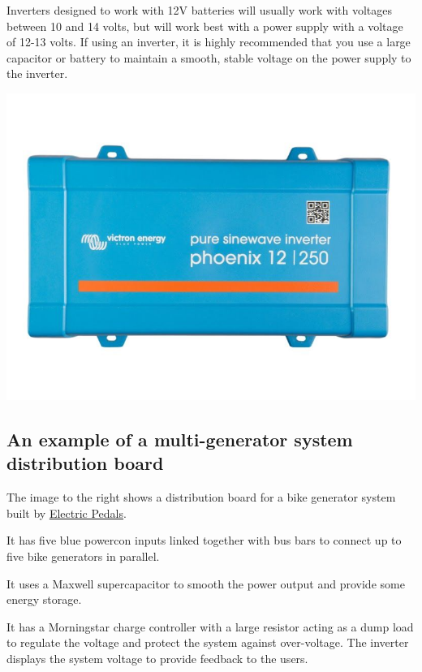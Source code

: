 \documentclass{article}
\theoremstyle{definition}
\theoremstyle{definition}
\theoremstyle{remark}
\begin{document}
    Inverters designed to work with 12V batteries will usually work with voltages between 10 and 14 volts, but will work best with a power supply with a voltage of 12-13 volts. If using an inverter, it is highly recommended that you use a large capacitor or battery to maintain a smooth, stable voltage on the power supply to the inverter.
  
    \begin{center}
      \includegraphics[width=0.15\paperwidth]{../Images/image_5_3_(inverter).png}
    \end{center}


  \subsection{An example of a multi-generator system distribution board} %
  \label{sub:an_example_of_a_multi_generator_system_distribution_board}

    The image to the right shows a distribution board for a bike generator system built by \href{https://www.electricpedals.com/}{\underline{Electric Pedals}}.

    It has five blue powercon inputs linked together with bus bars to connect up to five bike generators in parallel. 

    It uses a Maxwell supercapacitor to smooth the power output and provide some energy storage.

    It has a Morningstar charge controller with a large resistor acting as a dump load to regulate the voltage and protect the system against over-voltage. The inverter displays the system voltage to provide feedback to the users.
\end{document}
